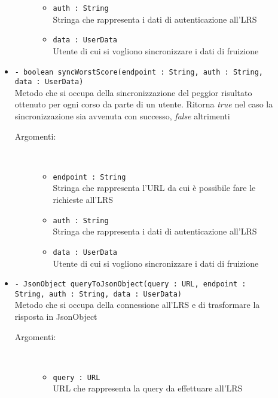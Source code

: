\documentclass[../Tesi.tex]{subfiles}
\begin{document}
\begin{description}
\begin{itemize}
\begin{description}
\begin{itemize}
						\item \texttt{auth : String}\\
						Stringa che rappresenta i dati di autenticazione all'LRS

						\item \texttt{data : UserData}\\
						Utente di cui si vogliono sincronizzare i dati di fruizione
					\end{itemize}
				\end{description}

				\item \texttt{- boolean syncWorstScore(endpoint : String, auth : String, data : UserData)}\\
				Metodo che si occupa della sincronizzazione del peggior risultato ottenuto per ogni corso da parte di un utente. Ritorna \textit{true} nel caso la sincronizzazione sia avvenuta con successo, \textit{false} altrimenti
				\begin{description}
					\item[Argomenti:] \
					\begin{itemize}
						\item \texttt{endpoint : String}\\
						Stringa che rappresenta l'URL da cui è possibile fare le richieste all'LRS

						\item \texttt{auth : String}\\
						Stringa che rappresenta i dati di autenticazione all'LRS

						\item \texttt{data : UserData}\\
						Utente di cui si vogliono sincronizzare i dati di fruizione
					\end{itemize}
				\end{description}

				\item \texttt{- JsonObject queryToJsonObject(query : URL, endpoint : String, auth : String, data : UserData)}\\
				Metodo che si occupa della connessione all'LRS e di trasformare la risposta in JsonObject
				\begin{description}
					\item[Argomenti:] \
					\begin{itemize}
						\item \texttt{query : URL}\\
						URL che rappresenta la query da effettuare all'LRS


\end{itemize}
\end{description}
\end{itemize}
\end{description}
\end{document}

